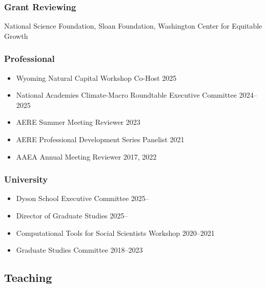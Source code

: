 \documentclass[11pt]{res} %
\begin{document}
\begin{resume}
\vspace{-.2in}

\subsubsection{Grant Reviewing} 

\vspace{-.2in}

National Science Foundation, Sloan Foundation, Washington Center for Equitable Growth

\vspace{-.2in}


\subsubsection{Professional}
\begin{itemize} \itemsep -1pt
	\item[] Wyoming Natural Capital Workshop Co-Host \hfill 2025
	\item[] National Academies Climate-Macro Roundtable Executive Committee  \hfill 2024--2025
	\item[] AERE Summer Meeting Reviewer \hfill 2023
	\item[]	AERE Professional Development Series Panelist \hfill 2021
	\item[] AAEA Annual Meeting Reviewer \hfill 2017, 2022
\end{itemize}


\vspace{-.2in}

\subsubsection{University}
\begin{itemize} \itemsep -1pt
	\item[] Dyson School Executive Committee \hfill 2025--
	\item[] Director of Graduate Studies \hfill 2025--
	\item[] Computational Tools for Social Scientists Workshop \hfill 2020--2021
	\item[]	Graduate Studies Committee \hfill 2018--2023
\end{itemize}

\vspace{-.2in}

\subsection{Teaching}\vspace{-.2in}

\end{resume}
\end{document}
